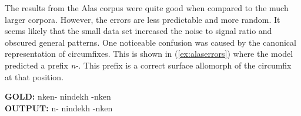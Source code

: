 The results from the Alas corpus were quite good when compared to the much larger corpora. However, the errors are less predictable and more random. It seems likely that the small data set increased the noise to signal ratio and obscured general patterns. 
One noticeable confusion was caused by the canonical representation of circumfixes. This is shown in (\ref{ex:alaserrors}) where the model predicted a prefix \textit{n-}. This prefix is a correct surface allomorph of the circumfix at that position. 

\pex   
\label{ex:alaserrors}
\a \textbf{GOLD:} \hspace{2mm} n\textlangle{}\textrangle{}ken- \hspace{1mm} nindekh \hspace{1mm} -n\textlangle{}\textrangle{}ken \\
\textbf{OUTPUT:} \hspace{2mm} n- \hspace{5mm} nindekh \hspace{2mm} -n\textlangle{}\textrangle{}ken
\xe



